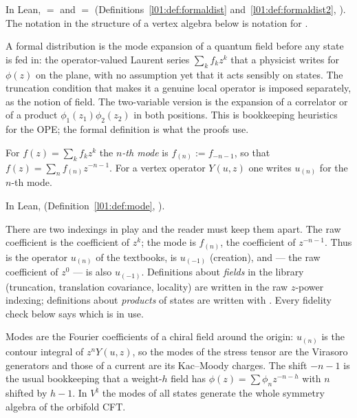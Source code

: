 In Lean,  $=$  and  $=$ 
(Definitions~\ref{l01:def:formaldist} and~\ref{l01:def:formaldist2},
).  The notation  in the
structure of a vertex algebra below is notation for .

\begin{physics}
A formal distribution is the mode expansion of a quantum field before any state is fed in: the operator-valued Laurent series $\sum_k f_kz^k$ that a physicist writes for $\phi(z)$ on the plane, with no assumption yet that it acts sensibly on states. The truncation condition that makes it a genuine local operator is imposed separately, as the notion of field. The two-variable version is the expansion of a correlator or of a product $\phi_1(z_1)\phi_2(z_2)$ in both positions. This is bookkeeping heuristics for the OPE; the formal definition is what the proofs use.
\end{physics}

\begin{definition}[Modes]\label{ch10:def:mode}
For $f(z)=\sum_k f_kz^k$ the \emph{$n$-th mode} is $f_{(n)}:=f_{-n-1}$, so that
$f(z)=\sum_n f_{(n)}z^{-n-1}$.  For a vertex operator $Y(u,z)$ one writes $u_{(n)}$ for the
$n$-th mode.
\end{definition}

In Lean,  (Definition~\ref{l01:def:mode},
).

\begin{dictionary}
There are two indexings in play and the reader must keep them apart.  The raw coefficient
 is the coefficient of $z^k$; the mode  is $f_{(n)}$, the coefficient of
$z^{-n-1}$.  Thus  is the operator $u_{(n)}$ of the textbooks, 
is $u_{(-1)}$ (creation), and  --- the raw coefficient of $z^0$ --- is also
$u_{(-1)}$.  Definitions about \emph{fields} in the library (truncation, translation covariance,
locality) are written in the raw $z$-power indexing; definitions about \emph{products} of states
are written with .  Every fidelity check below says which is in use.
\end{dictionary}

\begin{physics}
Modes are the Fourier coefficients of a chiral field around the origin: $u_{(n)}$ is the contour integral of $z^nY(u,z)$, so the modes of the stress tensor are the Virasoro generators and those of a current are its Kac--Moody charges. The shift $-n-1$ is the usual bookkeeping that a weight-$h$ field has $\phi(z)=\sum\phi_nz^{-n-h}$ with $n$ shifted by $h-1$. In $V^\natural$ the modes of all states generate the whole symmetry algebra of the orbifold CFT.
\end{physics}


